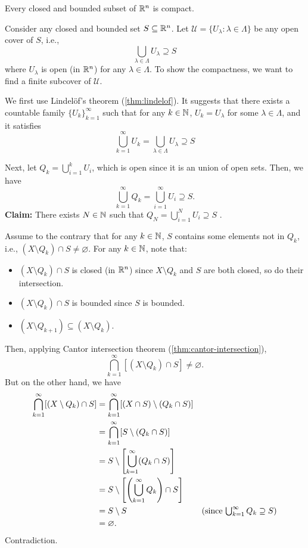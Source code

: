 \begin{enumerate}
\begin{theorem}
\label{thm:heine-borel}
Every closed and bounded subset of \(\mathbb{R}^n\) is compact.
\end{theorem}
\begin{pf}
Consider any closed and bounded set \(S\subseteq \mathbb{R}^n\). Let
\(\mathcal{U}=\{U_{\lambda}:\lambda\in\Lambda\}\) be any open cover of \(S\),
i.e.,
\[
\bigcup_{\lambda\in\Lambda}U_{\lambda}\supseteq S
\]
where \(U_{\lambda}\) is open (in \(\mathbb{R}^n\)) for any \(\lambda\in\Lambda\). To
show the compactness, we want to find a finite subcover of \(\mathcal{U}\).

We first use Lindel\"o{f}'s theorem (\cref{thm:lindelof}). It suggests that
there exists a countable family \(\{U_k\}_{k=1}^{\infty}\) such that for any
\(k\in\mathbb{N}\), \(U_k=U_{\lambda}\) for some \(\lambda\in\Lambda\), and it satisfies
\[
\bigcup_{k=1}^{\infty}U_k=\bigcup_{\lambda\in\Lambda}U_{\lambda}\supseteq S
\]

Next, let \(\displaystyle Q_k=\bigcup_{i=1}^{k}U_i\), which is open since it is
an union of open sets. Then, we have
\[
\bigcup_{k=1}^{\infty}Q_k=\bigcup_{i=1}^{\infty}U_i\supseteq S.
\]
\textbf{Claim:} There exists \(N\in\mathbb{N}\) such that \(\displaystyle
Q_{N}=\bigcup_{i=1}^{N}U_i\supseteq S\) .

\begin{pf}
Assume to the contrary that for any \(k\in\mathbb{N}\), \(S\) contains some elements
not in \(Q_k\), i.e., \((X\setminus Q_{k})\cap S\ne\varnothing\). For any
\(k\in\mathbb{N}\), note that:
\begin{itemize}
\item \((X\setminus Q_k)\cap S\) is closed (in \(\mathbb{R}^n\)) since \(X\setminus
Q_k\) and \(S\) are both closed, so do their intersection.
\item \((X\setminus Q_k)\cap S\) is bounded since \(S\) is bounded.
\item \((X\setminus Q_{k+1})\subseteq (X\setminus Q_k)\).
\end{itemize}
Then, applying Cantor intersection theorem (\cref{thm:cantor-intersection}),
\[
\bigcap_{k=1}^{\infty}[(X\setminus Q_k)\cap S]\ne\varnothing.
\]
But on the other hand, we have
\begin{align*}
\bigcap_{k=1}^{\infty}[(X\setminus Q_k)\cap S]
&=\bigcap_{k=1}^{\infty}[(X\cap S)\setminus (Q_k\cap S)]\\
&=\bigcap_{k=1}^{\infty}[S\setminus (Q_k\cap S)]\\
&=S\setminus \qty[\bigcup_{k=1}^{\infty}(Q_k\cap S)]\\
&=S\setminus \qty[\qty(\bigcup_{k=1}^{\infty}Q_k)\cap S]\\
&=S\setminus S&\text{(since \(\textstyle\bigcup_{k=1}^{\infty}Q_k\supseteq S\))}\\
&=\varnothing.
\end{align*}
Contradiction.
\end{pf}


\end{pf}
\end{enumerate}
